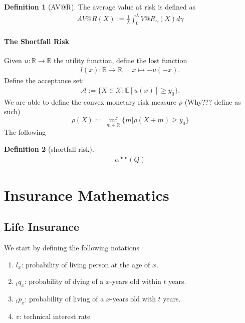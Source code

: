 \documentclass[a4paper,11pt]{book}
\theoremstyle{definition}
\newtheorem{definition}{Definition}[section]
\theoremstyle{remark}
\begin{document}
\begin{definition}[AV@R]
The average value at risk is defined as
\begin{align*}
	AV@R (X):= \frac{1}{\lambda} \int_0^\lambda V@R_\gamma (X) d\gamma
\end{align*}
\end{definition}


\subsubsection{The Shortfall Risk}
Given $u: \mathbb{R} \rightarrow \mathbb{R}$ the utility function, define the lost function
\begin{align*}
	l(x): \mathbb{R} \rightarrow \mathbb{R}, \quad x \mapsto - u(-x). 
\end{align*}
Define the acceptance set:
\begin{align*}
	\mathcal{A} := \{ X \in \mathcal{X}:  \mathbb{E}[u(x)] \ge y_0 \}.
\end{align*}
We are able to define the convex monetary risk measure $\rho$ (Why??? define as such)
\begin{equation}
	\rho(X):= \inf_{ m \in \mathbb{R}} \{ m |\rho(X + m) \ge y_0 \}
\end{equation}
The following 

\begin{definition}[shortfall risk]
\begin{align*}
	\alpha^{\min}(Q)
\end{align*}
\end{definition}


\chapter{Insurance Mathematics}
\section{Life Insurance}
We start by defining the following notations
\begin{enumerate}
	\item $l_x$: probability of living person at the age of $x$.
	\item ${}_t q_x$: probability of dying of a $x$-years old within $t$ years.
	\item ${}_t p_x$: probability of living of a $x$-years old with $t$ years. 
	\item $v$: technical interest rate
\end{enumerate}
\end{document}
